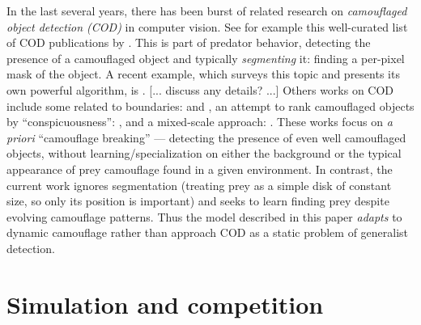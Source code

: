 \documentclass[sigconf]{acmart}
\newcommand{\jargon}[1]{\textit{#1}}
\begin{document}
\par
In the last several years, there has been burst of related research on \jargon{camouflaged object detection (COD)} in computer vision. See for example this well-curated list of COD publications by \citet{visionxiang_cod}. This is part of predator behavior, detecting the presence of a camouflaged object and typically \jargon{segmenting} it: finding a per-pixel mask of the object. A recent example, which surveys this topic and presents its own powerful algorithm, is \citet{Zhang2022}. [... discuss any details? ...] Others works on COD include some related to boundaries: \citet{chen_boundary-guided_2022} and \citet{sun_boundary-guided_2022}, an attempt to rank camouflaged objects by “conspicuousness”: \citet{lv_cod_2022}, and a mixed-scale approach: \citet{pang_zoom_2022}. These works focus on \textit{a priori} “camouflage breaking” — detecting the presence of even well camouflaged objects, without learning/specialization on either the background or the typical appearance of prey camouflage found in a given environment. In contrast, the current work ignores segmentation (treating prey as a simple disk of constant size, so only its position is important) and seeks to learn finding prey despite evolving camouflage patterns. Thus the model described in this paper \jargon{adapts} to dynamic camouflage rather than approach COD as a static problem of generalist detection.
\par


\section{Simulation and competition}
\end{document}
